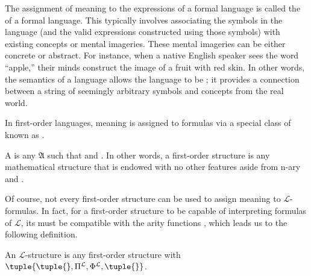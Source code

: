 \vspace{0.3cm}
\noindent
The assignment of meaning to the expressions of a formal language is called the  of a formal language. This typically involves
associating the symbols in the language (and the valid expressions constructed using those symbols) with existing concepts or mental imageries.
These mental imageries can be either concrete or abstract. For instance, when a native English speaker sees the word ``apple,'' their minds
construct the image of a fruit with red skin. In other words, the semantics of a language allows the language to be ;
it provides a connection between a string of seemingly arbitrary symbols and concepts from the real world.

\vspace{0.3cm}
\noindent
In first-order languages, meaning is assigned to formulas via a special class of 
known as .

\begin{dfn}
    A  is any  \( \mathfrak{A} \) such that
    and .
    In other words, a first-order structure is any mathematical structure that is endowed with no other features
    aside from n-ary  and .
\end{dfn}

\noindent
Of course, not every first-order structure can be used to assign meaning to \( \mathcal{L} \)-formulas.
In fact, for a first-order structure to be capable of interpreting formulas of \( \mathcal{L} \),
its  must be compatible with the arity functions
,
which leads us to the following definition.

\begin{dfn}
    An \( \mathcal{L} \)-structure is any first-order structure with 
    \( \tuple{\tuple{}, \Pi^{\mathcal{L}}, \Phi^{\mathcal{L}}, \tuple{}} \).
\end{dfn}

